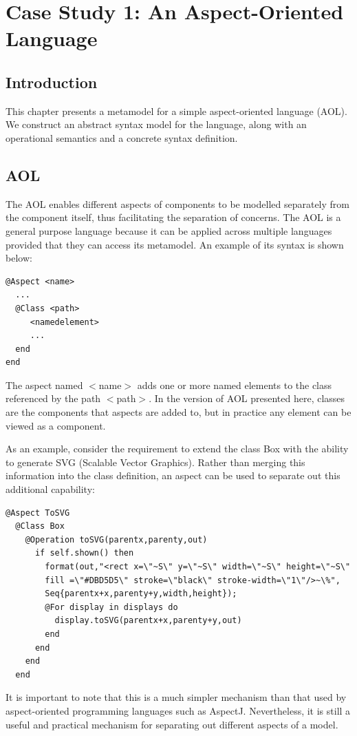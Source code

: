 \chapter{Case Study 1: An Aspect-Oriented Language}

\section{Introduction}

This chapter presents a metamodel for a simple aspect-oriented
language (AOL). We construct an abstract syntax model for the
language, along with an operational semantics and a concrete
syntax definition.

\section{AOL}

The AOL enables different aspects of components to be modelled
separately from the component itself, thus facilitating the
separation of concerns. The AOL is a general purpose language
because it can be applied across multiple languages provided that
they can access its metamodel. An example of its syntax is shown
below:

\begin{lstlisting}
@Aspect <name>
  ...
  @Class <path>
     <namedelement>
     ...
  end
end
\end{lstlisting}The aspect named $<$name$>$ adds one or more named elements to the
class referenced by the path $<$path$>$. In the version of AOL
presented here, classes are the components that aspects are added
to, but in practice any element can be viewed as a component.

As an example, consider the requirement to extend the class Box
with the ability to generate SVG (Scalable Vector Graphics).
Rather than merging this information into the class definition, an
aspect can be used to separate out this additional capability:

\begin{lstlisting}
@Aspect ToSVG
  @Class Box
    @Operation toSVG(parentx,parenty,out)
      if self.shown() then
        format(out,"<rect x=\"~S\" y=\"~S\" width=\"~S\" height=\"~S\"
        fill =\"#DBD5D5\" stroke=\"black\" stroke-width=\"1\"/>~\%",
        Seq{parentx+x,parenty+y,width,height});
        @For display in displays do
          display.toSVG(parentx+x,parenty+y,out)
        end
      end
    end
  end
\end{lstlisting}It is important to note that this is a much simpler mechanism than
that used by aspect-oriented programming languages such as
AspectJ. Nevertheless, it is still a useful and practical
mechanism for separating out different aspects of a model.

